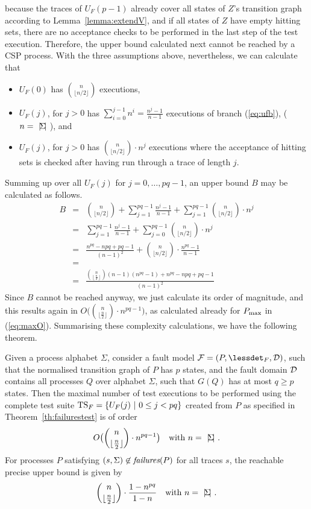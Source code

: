 because the traces of $U_F(p-1)$ already cover all states of $Z$'s transition
graph according to Lemma~\ref{lemma:extendV}, and if all states of $Z$ have
empty hitting sets, there are no acceptance checks to be performed in the
last step of the test execution. Therefore, \pagebreak the upper bound
calculated next cannot be reached by a CSP process. With the three
assumptions above, nevertheless, we can calculate that
%
\begin{itemize}
\item  $U_F(0)$ has  $\binom{n}{\lfloor n/2\rfloor}$ executions,
\item $U_F(j)$, for $j > 0$ has $\sum_{i=0}^{j-1} n^i = \frac{n^j -
    1}{n-1}$ executions of branch (\ref{eq:ufb}), ($n = {~|\! \Sigma\!|~}$),
    and
\item $U_F(j)$, for $j > 0$ has $\binom{n}{\lfloor n/2\rfloor}\cdot n^j$
    executions where the acceptance of hitting sets is checked after having
    run through a trace of length $j$.
\end{itemize}
%
Summing up over all $U_F(j)$ for $j=0,\dots,pq-1$, an upper bound $B$ may be calculated as follows.
%
\begin{eqnarray*}
B & = & \binom{n}{\lfloor n/2\rfloor} + \sum_{j=1}^{pq-1} \frac{n^j - 1}{n-1} +
\sum_{j=1}^{pq-1}\binom{n}{\lfloor n/2\rfloor}\cdot n^j
   \\
& = &    \sum_{j=1}^{pq-1} \frac{n^j - 1}{n-1} +
\sum_{j=0}^{pq-1}\binom{n}{\lfloor n/2\rfloor}\cdot n^j
\\
& = & \frac{n^{pq}-n pq+pq-1}{(n-1)^2} +
\binom{n}{\lfloor n/2\rfloor} \cdot \frac{n^{pq} - 1}{n-1}
\\
& = &
\\
& = & \frac{\binom{n}{\left\lfloor \frac{n}{2}\right\rfloor}(n-1) \left(n^{pq}-1\right) +n^{pq}-npq+pq-1}{(n-1)^2}
\end{eqnarray*}
%
Since $B$ cannot be reached anyway, we just calculate its order of magnitude,
and this results again in $O\big(\binom{n}{\lfloor\frac{n}{2}\rfloor}  \cdot
n^{pq-1}\big)$, as calculated already for $P_\text{max}$ in (\ref{eq:maxO}).
%
Summarising these complexity calculations, we have the following theorem.
%
\begin{theorem}
\label{th:maxexecs}
Given a process alphabet $\Sigma$, consider a fault model ${\cal F} = (P,\lessdet_F,{\cal D})$, such that
the normalised transition graph of $P$ has $p$ states, and the fault domain
${\cal D}$ contains all processes $Q$ over alphabet $\Sigma$, such that $G(Q)$ has at most
$q\ge p$ states. Then the maximal
number of test executions to be performed   using the complete test
suite ${\text{TS}}_F = \{ U_F(j)~|~0 \le j < pq  \}$ created from $P$ as specified in Theorem~\ref{th:failurestest} is of order
%
\begin{equation*}
O\big(\binom{n}{\lfloor\frac{n}{2}\rfloor}\cdot n^{pq-1}\big)\quad\text{with $n={~|\! \Sigma\!|~}$}.
\end{equation*}
For processes $P$ satisfying $(s,\Sigma)\not\in\text{\it failures}(P)$ for all traces $s$, the reachable
precise  upper bound is given by
%
\begin{equation*}
\binom{n}{\lfloor\frac{n}{2}\rfloor}\cdot\frac{1-n^{pq}}{1-n}\quad\text{with $n={~|\! \Sigma\!|~}$}.
\end{equation*}
\xbox
\end{theorem}
